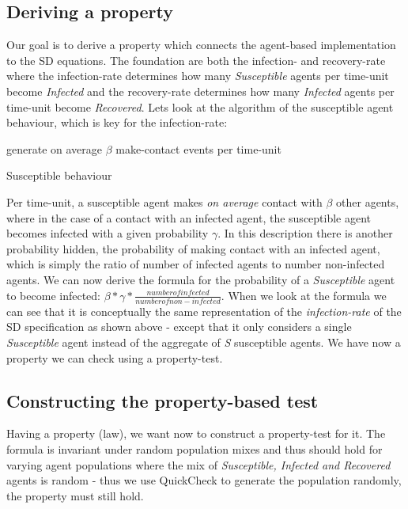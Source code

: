 \subsection{Deriving a property}
Our goal is to derive a property which connects the agent-based implementation to the SD equations. The foundation are both the infection- and recovery-rate where the infection-rate determines how many \textit{Susceptible} agents per time-unit become \textit{Infected} and the recovery-rate determines how many \textit{Infected} agents per time-unit become \textit{Recovered}. Lets look at the algorithm of the susceptible agent behaviour, which is key for the infection-rate:

\begin{algorithm}
generate on average $\beta$ make-contact events per time-unit\; 
\caption{Susceptible behaviour}
\end{algorithm}

Per time-unit, a susceptible agent makes \textit{on average} contact with $\beta$ other agents, where in the case of a contact with an infected agent, the susceptible agent becomes infected with a given probability $\gamma$. In this description there is another probability hidden, the probability of making contact with an infected agent, which is simply the ratio of number of infected agents to number non-infected agents. We can now derive the formula for the probability of a \textit{Susceptible} agent to become infected: $\beta * \gamma * \frac{number of infected}{number of non-infected}$. When we look at the formula we can see that it is conceptually the same representation of the \textit{infection-rate} of the SD specification as shown above - except that it only considers a single \textit{Susceptible} agent instead of the aggregate of \textit{S} susceptible agents. We have now a property we can check using a property-test.

\subsection{Constructing the property-based test}
Having a property (law), we want now to construct a property-test for it. The formula is invariant under random population mixes and thus should hold for varying agent populations where the mix of \textit{Susceptible, Infected and Recovered} agents is random - thus we use QuickCheck to generate the population randomly, the property must still hold.


